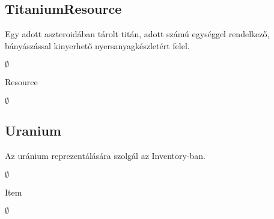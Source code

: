 \subsection{TitaniumResource}
\begin{class-template-responsibility}
Egy adott aszteroidában tárolt titán, adott számú egységgel rendelkező, bányászással kinyerhető nyersanyagkészletért felel. 
\end{class-template-responsibility}
\begin{class-template-interface}
$\emptyset$
\end{class-template-interface}
\begin{class-template-baseclass}
Resource
\end{class-template-baseclass}
\begin{class-template-attribute}
\item[] $\emptyset$
\end{class-template-attribute}
\begin{class-template-method}
\end{class-template-method}


\subsection{Uranium}
\begin{class-template-responsibility}
Az uránium reprezentálására szolgál az Inventory-ban.
\end{class-template-responsibility}
\begin{class-template-interface}
$\emptyset$
\end{class-template-interface}
\begin{class-template-baseclass}
Item
\end{class-template-baseclass}
\begin{class-template-attribute}
\item[] $\emptyset$
\end{class-template-attribute}
\begin{class-template-method}
\end{class-template-method}


